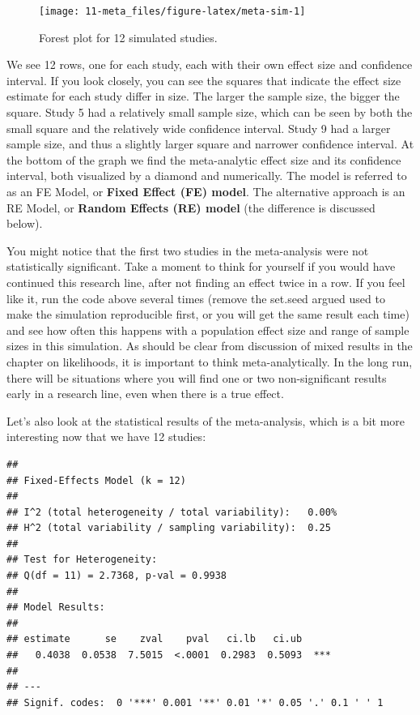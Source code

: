 \documentclass[
  oneside]{krantz}
\begin{document}
\begin{figure}

{\centering \texttt{[image: 11-meta\_files/figure-latex/meta-sim-1]} 

}

\caption{Forest plot for 12 simulated studies.}\label{fig:meta-sim}
\end{figure}

We see 12 rows, one for each study, each with their own effect size and confidence interval. If you look closely, you can see the squares that indicate the effect size estimate for each study differ in size. The larger the sample size, the bigger the square. Study 5 had a relatively small sample size, which can be seen by both the small square and the relatively wide confidence interval. Study 9 had a larger sample size, and thus a slightly larger square and narrower confidence interval. At the bottom of the graph we find the meta-analytic effect size and its confidence interval, both visualized by a diamond and numerically. The model is referred to as an FE Model, or \textbf{Fixed Effect (FE) model}. The alternative approach is an RE Model, or \textbf{Random Effects (RE) model} (the difference is discussed below).

You might notice that the first two studies in the meta-analysis were not statistically significant. Take a moment to think for yourself if you would have continued this research line, after not finding an effect twice in a row. If you feel like it, run the code above several times (remove the set.seed argued used to make the simulation reproducible first, or you will get the same result each time) and see how often this happens with a population effect size and range of sample sizes in this simulation. As should be clear from discussion of mixed results in the chapter on likelihoods, it is important to think meta-analytically. In the long run, there will be situations where you will find one or two non-significant results early in a research line, even when there is a true effect.

Let's also look at the statistical results of the meta-analysis, which is a bit more interesting now that we have 12 studies:

\begin{verbatim}
## 
## Fixed-Effects Model (k = 12)
## 
## I^2 (total heterogeneity / total variability):   0.00%
## H^2 (total variability / sampling variability):  0.25
## 
## Test for Heterogeneity:
## Q(df = 11) = 2.7368, p-val = 0.9938
## 
## Model Results:
## 
## estimate      se    zval    pval   ci.lb   ci.ub     ​ 
##   0.4038  0.0538  7.5015  <.0001  0.2983  0.5093  *** 
## 
## ---
## Signif. codes:  0 '***' 0.001 '**' 0.01 '*' 0.05 '.' 0.1 ' ' 1
\end{verbatim}
\end{document}
